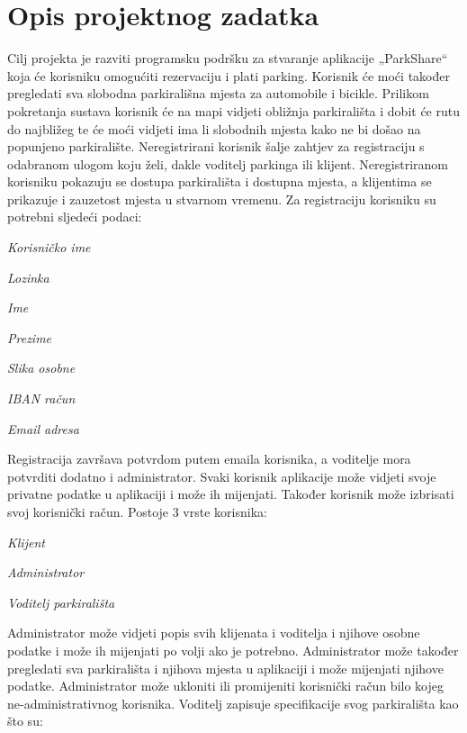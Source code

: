 \chapter{Opis projektnog zadatka}
		
		
		Cilj projekta je razviti programsku podršku za stvaranje aplikacije „ParkShare“ koja će korisniku omogućiti rezervaciju i plati parking. Korisnik će moći također pregledati sva slobodna parkirališna mjesta za automobile i bicikle. Prilikom pokretanja sustava korisnik će na mapi vidjeti obližnja parkirališta i dobit će rutu do najbližeg te će moći vidjeti ima li slobodnih mjesta kako ne bi došao na popunjeno parkiralište.
Neregistrirani korisnik šalje zahtjev za registraciju s odabranom ulogom koju želi, dakle voditelj parkinga ili klijent. Neregistriranom korisniku pokazuju se dostupa parkirališta i dostupna mjesta, a klijentima se prikazuje i zauzetost mjesta u stvarnom vremenu. Za registraciju korisniku su potrebni sljedeći podaci:

		\begin{packed_item}
			\item \textit{Korisničko ime }
			\item \textit{Lozinka }
			\item \textit{Ime }
			\item \textit{Prezime}
			\item \textit{Slika osobne }
			\item \textit{IBAN račun }
			\item \textit{Email adresa }
		\end{packed_item}
		
	Registracija završava potvrdom putem emaila korisnika, a voditelje mora potvrditi dodatno i administrator. Svaki korisnik aplikacije može vidjeti svoje privatne podatke u aplikaciji i može ih mijenjati. Također korisnik može izbrisati svoj korisnički račun. 
Postoje 3 vrste korisnika:

                \begin{packed_item}
			\item \textit{Klijent }
			\item \textit{Administrator }
			\item \textit{Voditelj parkirališta}
		\end{packed_item}

Administrator može vidjeti popis svih klijenata i voditelja i njihove osobne podatke i može ih mijenjati po volji ako je potrebno. Administrator može također pregledati sva parkirališta i njihova mjesta u aplikaciji i može mijenjati njihove podatke. Administrator može ukloniti ili promijeniti korisnički račun bilo kojeg ne-administrativnog korisnika. 
Voditelj zapisuje specifikacije svog parkirališta kao što su:

